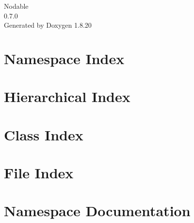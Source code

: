 \let\mypdfximage\pdfximage\def\pdfximage{\immediate\mypdfximage}\documentclass[twoside]{book}
\newcommand{\+}{\discretionary{\mbox{\scriptsize$\hookleftarrow$}}{}{}}
\newcommand{\clearemptydoublepage}{%
  \newpage{\pagestyle{empty}\cleardoublepage}%
}
\begin{document}
\hypersetup{pageanchor=false,
             bookmarksnumbered=true,
             pdfencoding=unicode
            }
\begin{titlepage}
\vspace*{7cm}
\begin{center}%
{\Large Nodable \\[1ex]\large 0.\+7.\+0 }\\
\vspace*{1cm}
{\large Generated by Doxygen 1.8.20}\\
\end{center}
\end{titlepage}
\clearemptydoublepage
{}
\tableofcontents
\clearemptydoublepage
{}
\hypersetup{pageanchor=true}

\chapter{Namespace Index}

\chapter{Hierarchical Index}

\chapter{Class Index}

\chapter{File Index}

\chapter{Namespace Documentation}


\end{document}
